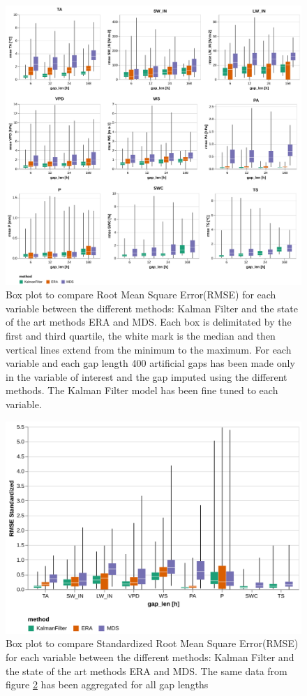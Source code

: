 \documentclass{article}
\newcommand{\imgwidth}{6in}
\begin{document}
\begin{figure}
    \centerline{\includegraphics[width=\imgwidth]{the_plot}}
\caption{Box plot to compare Root Mean Square Error(RMSE) for each variable between the different methods: Kalman Filter and the state of the art methods ERA and MDS.  Each box is delimitated by the first and third quartile, the white mark is the median and then vertical lines extend from the minimum to the maximum. For each variable and each gap length 400 artificial gaps has been made only in the variable of interest and the gap imputed using the different methods. The Kalman Filter model has been fine tuned to each variable.}
\label{fig:the_plot}
\end{figure}


\begin{figure}
    \centerline{\includegraphics[width=\imgwidth]{the_plot_stand}}
\caption{Box plot to compare Standardized Root Mean Square Error(RMSE) for each variable between the different methods: Kalman Filter and the state of the art methods ERA and MDS. The same data from figure \ref{fig:the_plot} has been aggregated for all gap lengths}
\label{fig:the_plot}
\end{figure}
\end{document}
